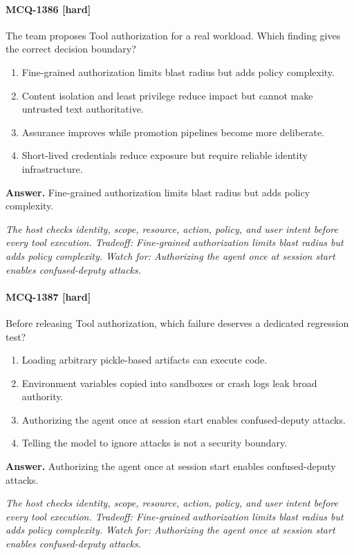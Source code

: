 \paragraph{MCQ-1386 [hard]} The team proposes Tool authorization for a real workload. Which finding gives the correct decision boundary?
\begin{enumerate}[label=\Alph*.]
\item Fine-grained authorization limits blast radius but adds policy complexity.
\item Content isolation and least privilege reduce impact but cannot make untrusted text authoritative.
\item Assurance improves while promotion pipelines become more deliberate.
\item Short-lived credentials reduce exposure but require reliable identity infrastructure.
\end{enumerate}
\noindent\textbf{Answer.} Fine-grained authorization limits blast radius but adds policy complexity.
\par\textit{The host checks identity, scope, resource, action, policy, and user intent before every tool execution. Tradeoff: Fine-grained authorization limits blast radius but adds policy complexity. Watch for: Authorizing the agent once at session start enables confused-deputy attacks.}
\paragraph{MCQ-1387 [hard]} Before releasing Tool authorization, which failure deserves a dedicated regression test?
\begin{enumerate}[label=\Alph*.]
\item Loading arbitrary pickle-based artifacts can execute code.
\item Environment variables copied into sandboxes or crash logs leak broad authority.
\item Authorizing the agent once at session start enables confused-deputy attacks.
\item Telling the model to ignore attacks is not a security boundary.
\end{enumerate}
\noindent\textbf{Answer.} Authorizing the agent once at session start enables confused-deputy attacks.
\par\textit{The host checks identity, scope, resource, action, policy, and user intent before every tool execution. Tradeoff: Fine-grained authorization limits blast radius but adds policy complexity. Watch for: Authorizing the agent once at session start enables confused-deputy attacks.}
